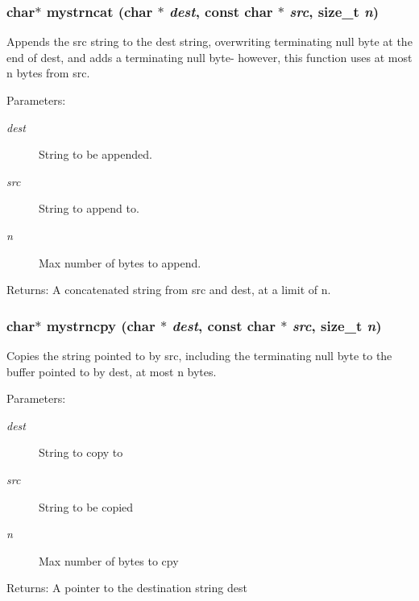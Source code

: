 \subsubsection{\setlength{\rightskip}{0pt plus 5cm}char$\ast$ mystrncat (char $\ast$ {\em dest}, const char $\ast$ {\em src}, size\_\-t {\em n})}\label{mystring_8h_36e5091b981e9da826d41e7977b8e507}


Appends the src string to the dest string, overwriting terminating null byte at the end of dest, and adds a terminating null byte- however, this function uses at most n bytes from src. 

\begin{Desc}
\item[Parameters:]
\begin{description}
\item[{\em dest}]String to be appended. \item[{\em src}]String to append to. \item[{\em n}]Max number of bytes to append. \end{description}
\end{Desc}
\begin{Desc}
\item[Returns:]A concatenated string from src and dest, at a limit of n. \end{Desc}
\subsubsection{\setlength{\rightskip}{0pt plus 5cm}char$\ast$ mystrncpy (char $\ast$ {\em dest}, const char $\ast$ {\em src}, size\_\-t {\em n})}\label{mystring_8h_86b7a78bb3914b2c6e6022b482c4a534}


Copies the string pointed to by src, including the terminating null byte to the buffer pointed to by dest, at most n bytes. 

\begin{Desc}
\item[Parameters:]
\begin{description}
\item[{\em dest}]String to copy to \item[{\em src}]String to be copied \item[{\em n}]Max number of bytes to cpy \end{description}
\end{Desc}
\begin{Desc}
\item[Returns:]A pointer to the destination string dest \end{Desc}

